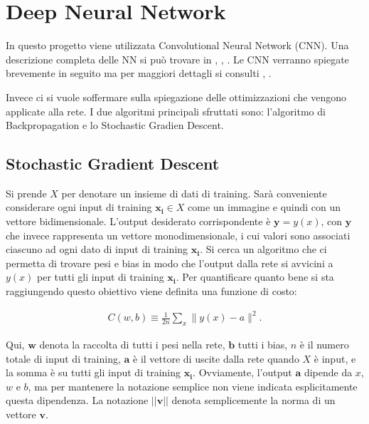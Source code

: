 \chapter{Deep Neural Network}

In questo progetto viene utilizzata Convolutional Neural Network (CNN). Una descrizione completa delle NN si può trovare in \cite{Goodfellow-et-al-2016}, \cite[509-542]{journals/jasis/Biron97}, \cite[37-121]{Kriesel2007NeuralNetworks}. Le CNN verranno spiegate brevemente in seguito ma per maggiori dettagli si consulti \cite[326-365]{Goodfellow-et-al-2016}, \cite[106-119]{HabibiAghdam2017}.

Invece ci si vuole soffermare sulla spiegazione delle ottimizzazioni che vengono applicate alla rete. I due algoritmi principali sfruttati sono: l'algoritmo di Backpropagation e lo Stochastic Gradien Descent.

\section{Stochastic Gradient Descent}
Si prende $X$ per denotare un insieme di dati di training. Sarà conveniente considerare ogni input di training $\mathbf{x_i } \in X$ come un immagine e quindi con un vettore bidimensionale. L'output desiderato corrispondente è $\mathbf{y} = y(x)$, con $\mathbf{y}$ che invece rappresenta un vettore monodimensionale, i cui valori sono associati ciascuno ad ogni dato di input di training $\mathbf{x_i}$.
Si cerca un algoritmo che ci permetta di trovare pesi e bias in modo che l'output dalla rete si avvicini a $y( x )$ per tutti gli input di training $\mathbf{x_i}$. Per quantificare quanto bene si sta raggiungendo questo obiettivo viene definita una funzione di costo:

\begin{eqnarray}  C(w,b) \equiv
  \frac{1}{2n} \sum_x \| y(x) - a\|^2.
\end{eqnarray}

Qui, $\mathbf{w}$ denota la raccolta di tutti i pesi nella rete, $\mathbf{b}$ tutti i bias, $n$ è il numero totale di input di training, $\mathbf{a}$ è il vettore di uscite dalla rete quando $X$ è input, e la somma è su tutti gli input di training $\mathbf{x_i}$.
Ovviamente, l'output $\mathbf{a}$ dipende da $x$, $w$ e $b$, ma per mantenere la notazione semplice non viene indicata esplicitamente questa dipendenza. La notazione $|| \mathbf{v} ||$ denota semplicemente la norma di un vettore $\mathbf{v}$.

